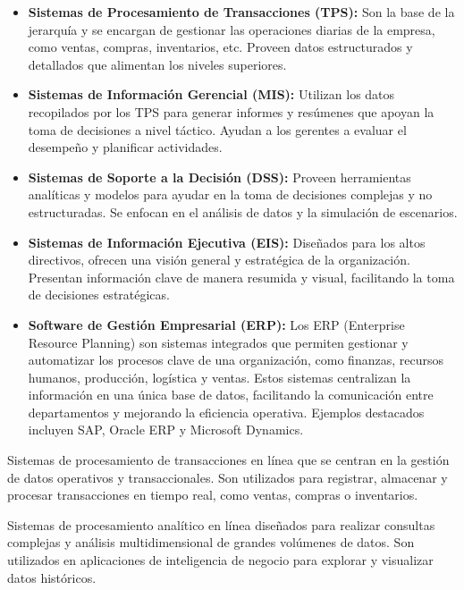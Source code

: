 \documentclass[12pt]{report} %
\begin{document}
\begin{itemize}
\item
  \textbf{Sistemas de Procesamiento de Transacciones (TPS):} Son la base
  de la jerarquía y se encargan de gestionar las operaciones diarias de
  la empresa, como ventas, compras, inventarios, etc. Proveen datos
  estructurados y detallados que alimentan los niveles superiores.
\item
  \textbf{Sistemas de Información Gerencial (MIS):} Utilizan los datos
  recopilados por los TPS para generar informes y resúmenes que apoyan
  la toma de decisiones a nivel táctico. Ayudan a los gerentes a evaluar
  el desempeño y planificar actividades.
\item
  \textbf{Sistemas de Soporte a la Decisión (DSS):} Proveen herramientas
  analíticas y modelos para ayudar en la toma de decisiones complejas y
  no estructuradas. Se enfocan en el análisis de datos y la simulación
  de escenarios.
\item
  \textbf{Sistemas de Información Ejecutiva (EIS):} Diseñados para los
  altos directivos, ofrecen una visión general y estratégica de la
  organización. Presentan información clave de manera resumida y visual,
  facilitando la toma de decisiones estratégicas.
\item
  \textbf{Software de Gestión Empresarial (ERP):} Los ERP (Enterprise
  Resource Planning) son sistemas integrados que permiten gestionar y
  automatizar los procesos clave de una organización, como finanzas,
  recursos humanos, producción, logística y ventas. Estos sistemas
  centralizan la información en una única base de datos, facilitando la
  comunicación entre departamentos y mejorando la eficiencia operativa.
  Ejemplos destacados incluyen SAP, Oracle ERP y Microsoft Dynamics.
\end{itemize}


\begin{definicion}
Sistemas de procesamiento de transacciones en línea que se centran en la gestión de datos operativos y transaccionales. Son utilizados para registrar, almacenar y procesar transacciones en tiempo real, como ventas, compras o inventarios.
\end{definicion}

\begin{definicion}
Sistemas de procesamiento analítico en línea diseñados para realizar consultas complejas y análisis multidimensional de grandes volúmenes de datos. Son utilizados en aplicaciones de inteligencia de negocio para explorar y visualizar datos históricos.
\end{definicion}
\end{document}
